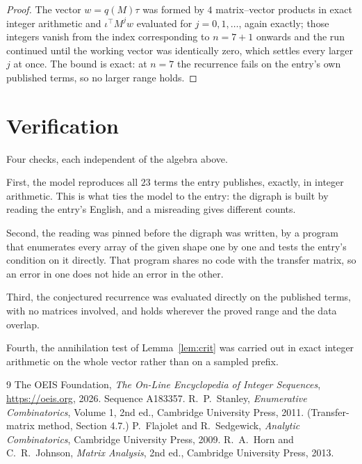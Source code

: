 \documentclass[11pt,a4paper]{article}
\theoremstyle{plain}
\theoremstyle{definition}
\begin{document}
\begin{proof}
The vector $w=q(M)\tau$ was formed by $4$ matrix--vector products in exact integer
arithmetic and $\iota^{\!\top}M^{j}w$ evaluated for $j=0,1,\dots$, again exactly; those
integers vanish from the index corresponding to $n=7+1$ onwards and the run continued
until the working vector was identically zero, which settles every larger $j$ at once. The bound is exact: at $n=7$ the recurrence fails on the entry's own published terms, so no larger range holds.
\end{proof}

\section{Verification}

Four checks, each independent of the algebra above.

First, the model reproduces all $23$ terms the entry publishes, exactly, in integer
arithmetic. This is what ties the model to the entry: the digraph is built by reading the
entry's English, and a misreading gives different counts.

Second, the reading was pinned before the digraph was written, by a program that enumerates
every array of the given shape one by one and tests the entry's condition on it directly. That program shares no code with the transfer matrix, so an error in one does not
hide an error in the other.

Third, the conjectured recurrence was evaluated directly on the published terms, with no
matrices involved, and holds wherever the proved range and the data overlap.

Fourth, the annihilation test of Lemma~\ref{lem:crit} was carried out in exact integer
arithmetic on the whole vector rather than on a sampled prefix.

\begin{thebibliography}{9}
 The OEIS Foundation, \emph{The On-Line Encyclopedia of Integer
Sequences}, \url{https://oeis.org}, 2026. Sequence A183357.
 R.~P.~Stanley, \emph{Enumerative Combinatorics}, Volume 1, 2nd ed.,
Cambridge University Press, 2011. (Transfer-matrix method, Section 4.7.)
 P.~Flajolet and R.~Sedgewick, \emph{Analytic Combinatorics}, Cambridge
University Press, 2009.
 R.~A.~Horn and C.~R.~Johnson, \emph{Matrix Analysis}, 2nd ed., Cambridge
University Press, 2013.
\end{thebibliography}
\end{document}
